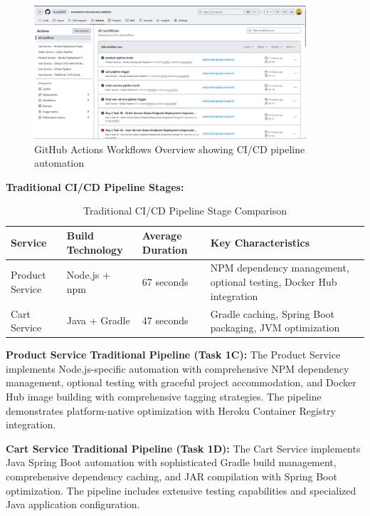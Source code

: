 \begin{figure}[H]
\centering
\includegraphics[width=0.9\textwidth]{figures/chapter4/github-actions-workflows-overview.png}
\caption{GitHub Actions Workflows Overview showing CI/CD pipeline automation}
\label{fig:github-actions-workflows-overview}
\end{figure}

\textbf{Traditional CI/CD Pipeline Stages:}

\begin{table}[H]
\centering
\caption{Traditional CI/CD Pipeline Stage Comparison}
\label{tab:traditional-pipeline-stages}
\begin{tabular}{|p{3cm}|p{3cm}|p{3cm}|p{5cm}|}
\hline
\textbf{Service} & \textbf{Build Technology} & \textbf{Average Duration} & \textbf{Key Characteristics} \\
\hline
Product Service & Node.js + npm & 67 seconds & NPM dependency management, optional testing, Docker Hub integration \\
\hline
Cart Service & Java + Gradle & 47 seconds & Gradle caching, Spring Boot packaging, JVM optimization \\
\hline
\end{tabular}
\end{table}

\textbf{Product Service Traditional Pipeline (Task 1C):}
The Product Service implements Node.js-specific automation with comprehensive NPM dependency management, optional testing with graceful project accommodation, and Docker Hub image building with comprehensive tagging strategies. The pipeline demonstrates platform-native optimization with Heroku Container Registry integration.

\textbf{Cart Service Traditional Pipeline (Task 1D):}
The Cart Service implements Java Spring Boot automation with sophisticated Gradle build management, comprehensive dependency caching, and JAR compilation with Spring Boot optimization. The pipeline includes extensive testing capabilities and specialized Java application configuration.

